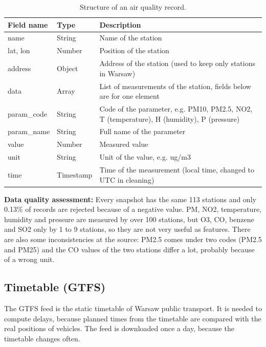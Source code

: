 \documentclass[11pt]{article}
\begin{document}
\begin{table}[H]
\centering
\caption{Structure of an air quality record.}\label{tab:fields-air}
\begin{tabular}{|>{\raggedright\arraybackslash}p{3.6cm}|>{\raggedright\arraybackslash}p{2cm}|>{\raggedright\arraybackslash}p{8cm}|}
\hline
\textbf{Field name} & \textbf{Type} & \textbf{Description} \\
\hline
name & String & Name of the station \\ \hline
lat, lon & Number & Position of the station \\ \hline
address & Object & Address of the station (used to keep only stations in Warsaw) \\ \hline
data & Array & List of measurements of the station, fields below are for one element \\ \hline
param\_code & String & Code of the parameter, e.g. PM10, PM2.5, NO2, T (temperature), H (humidity), P (pressure) \\ \hline
param\_name & String & Full name of the parameter \\ \hline
value & Number & Measured value \\ \hline
unit & String & Unit of the value, e.g. ug/m3 \\ \hline
time & Timestamp & Time of the measurement (local time, changed to UTC in cleaning) \\ \hline
\end{tabular}
\end{table}

\noindent\textbf{Data quality assessment:}
Every snapshot has the same 113 stations and only 0.13\% of records are rejected because of a negative value. PM, NO2, temperature, humidity and pressure are measured by over 100 stations, but O3, CO, benzene and SO2 only by 1 to 9 stations, so they are not very useful as features. There are also some inconsistencies at the source: PM2.5 comes under two codes (PM2.5 and PM25) and the CO values of the two stations differ a lot, probably because of a wrong unit.

\subsection{Timetable (GTFS)}

The GTFS feed is the static timetable of Warsaw public transport.
It is needed to compute delays, because planned times from the timetable are compared with the real positions of vehicles.
The feed is downloaded once a day, because the timetable changes often.
\end{document}
